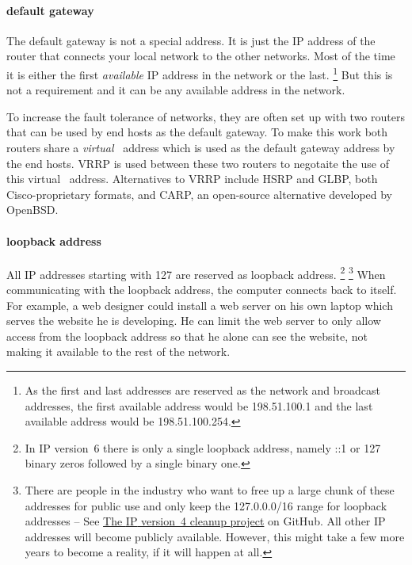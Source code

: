 \paragraph{default gateway}
The default gateway is not a special address.
It is just the \acs{IP} address of the router that connects your local network to the other networks.
Most of the time it is either the first \emph{available}
\acs{IP} address in the network or the last.%
   \footnote{As the first and last addresses are reserved as the network and broadcast addresses, the first available address would be 198.51.100.1 and the last available address would be 198.51.100.254.}
But this is not a requirement and it can be any available address in the network.



To increase the fault tolerance of networks, they are often set up with two routers that can be used by end hosts as the default gateway.
To make this work both routers share a \emph{virtual} \IP\ address which is used as the default gateway address by the end hosts.
\acf{VRRP} is used between these two routers to negotaite the use of this virtual \IP\ address.
Alternatives to \acs{VRRP} include \acs{HSRP} and \acs{GLBP}, both Cisco-proprietary formats, and \acs{CARP}, an open-source alternative developed by OpenBSD.


\paragraph{loopback address}
All \acs{IP} addresses starting with 127 are reserved as loopback address.%
   \footnote{In \acs{IP} version~6 there is only a single loopback address, namely ::1 or 127 binary zeros followed by a single binary one.}
   \footnote{
      There are people in the industry who want to free up a large chunk of these addresses for public use and only keep the 127.0.0.0/16 range for loopback addresses --
      See \href{https://github.com/schoen/unicast-extensions}{The \acs{IP} version~4 cleanup project} on GitHub.
      All other \acs{IP} addresses will become publicly available.
      However, this might take a few more years to become a reality, if it will happen at all.      
   }
When communicating with the loopback address, the computer connects back to itself.
For example, a web designer could install a web server on his own laptop which serves the website he is developing.
He can limit the web server to only allow access from the loopback address so that he alone can see the website, not making it available to the rest of the network.

